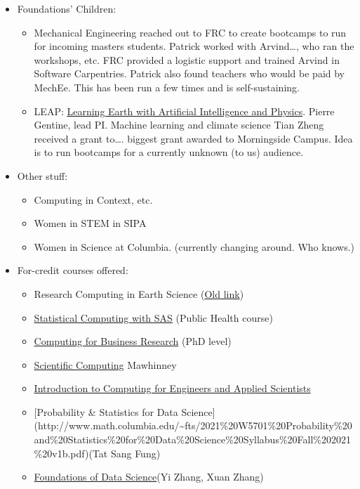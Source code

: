 \documentclass[%
  ,
  article,
  ,
  oneside
  ]{memoir}
\begin{document}
\begin{itemize}
\tightlist
\item
  Foundations' Children:

  \begin{itemize}
  \tightlist
  \item
    Mechanical Engineering reached out to FRC to create bootcamps to run
    for incoming masters students. Patrick worked with Arvind\ldots, who
    ran the workshops, etc. FRC provided a logistic support and trained
    Arvind in Software Carpentries. Patrick also found teachers who
    would be paid by MechEe. This has been run a few times and is
    self-sustaining.
  \item
    LEAP: \href{https://earth.columbia.edu/projects/view/2327}{Learning
    Earth with Artificial Intelligence and Physics}. Pierre Gentine,
    lead PI. Machine learning and climate science Tian Zheng received a
    grant to\ldots. biggest grant awarded to Morningside Campus. Idea is
    to run bootcamps for a currently unknown (to us) audience.
  \end{itemize}
\item
  Other stuff:

  \begin{itemize}
  \tightlist
  \item
    Computing in Context, etc.
  \item
    Women in STEM in SIPA
  \item
    Women in Science at Columbia. (currently changing around. Who
    knows.)
  \end{itemize}
\item
  For-credit courses offered:

  \begin{itemize}
  \tightlist
  \item
    Research Computing in Earth Science
    (\href{https://rabernat.github.io/research_computing/}{Old link})
  \item
    \href{https://www.coursicle.com/columbia/courses/BIST/P6110/}{Statistical
    Computing with SAS} (Public Health course)
  \item
    \href{https://www8.gsb.columbia.edu/courses/phd/2018/fall/b9122-001}{Computing
    for Business Research} (PhD level)
  \item
    \href{https://www.coursicle.com/columbia/courses/PHYS/G6080/}{Scientific
    Computing} Mawhinney
  \item
    \href{https://www.coursicle.com/columbia/courses/ENGI/E1006/}{Introduction
    to Computing for Engineers and Applied Scientists}
  \item
    {[}Probability \& Statistics for Data Science{]}
    (http://www.math.columbia.edu/\textasciitilde fts/2021\%20W5701\%20Probability\%20and\%20Statistics\%20for\%20Data\%20Science\%20Syllabus\%20Fall\%202021\%20v1b.pdf)(Tat
    Sang Fung)
  \item
    \href{https://www.coursicle.com/columbia/courses/ORCA/E2500/}{Foundations
    of Data Science}(Yi Zhang, Xuan Zhang)
  \end{itemize}
\end{itemize}
\end{document}
